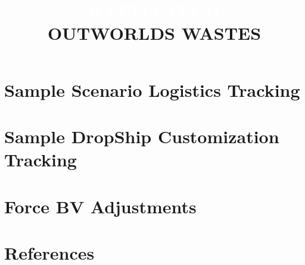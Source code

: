 \documentclass{article}
\begin{document}
\section{Sample Scenario Logistics Tracking}



\newpage

\section{Sample DropShip Customization Tracking}



\newpage

\section{Force BV Adjustments}
\label{sec:force_bv_adjustments}



\newpage

\section{References}
\label{sec:references}



\newpage


\clearpage

\setlength{\headsep}{25pt}

\title{
  \selectfont
  \vspace{6px}
  \fontsize{50}{60}\selectfont\textcolor{white}{\MakeUppercase{B}}\fontsize{45}{55}\selectfont\textcolor{white}{\MakeUppercase{attle}}\fontsize{50}{60}\selectfont\textcolor{white}{\MakeUppercase{T}}\fontsize{45}{55}\selectfont\textcolor{white}{\MakeUppercase{ech}}\\
  \fontsize{35}{42}\selectfont\MakeUppercase{Outworlds Wastes}
}
\end{document}
